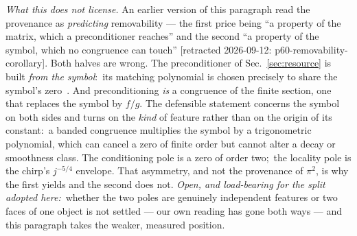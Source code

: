 \documentclass[aps,pra,twocolumn,superscriptaddress,longbibliography]{revtex4-2}
\begin{document}
\emph{What this does not license.}  An earlier version of this paragraph read
the provenance as \emph{predicting} removability --- the first price being ``a
property of the matrix, which a preconditioner reaches'' and the second ``a
property of the symbol, which no congruence can touch''
[retracted 2026-09-12: p60-removability-corollary].  Both halves are
wrong.  The preconditioner of Sec.~\ref{sec:resource} is built \emph{from the
symbol}:\ its matching polynomial is chosen precisely to share the symbol's
zero~\cite{serra1997}.  And preconditioning \emph{is} a congruence of the
finite section, one that replaces the symbol by $f/g$.  The defensible
statement concerns the symbol on both sides and turns on the \emph{kind} of
feature rather than on the origin of its constant:\ a banded congruence
multiplies the symbol by a trigonometric polynomial, which can cancel a zero of
finite order but cannot alter a decay or smoothness class.  The conditioning
pole is a zero of order two;\ the locality pole is the chirp's $j^{-5/4}$
envelope.  That asymmetry, and not the provenance of $\pi^2$, is why the first
yields and the second does not.  \emph{Open, and load-bearing for the split
adopted here:}\ whether the two poles are genuinely independent features or two
faces of one object is not settled --- our own reading has gone both ways ---
and this paragraph takes the weaker, measured position.
\end{document}
